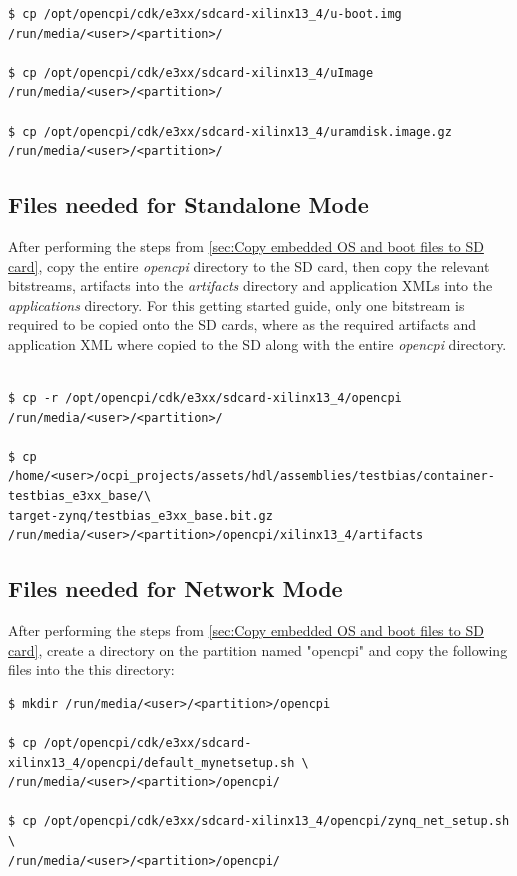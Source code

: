 \begin{appendices}
\begin{verbatim}
$ cp /opt/opencpi/cdk/e3xx/sdcard-xilinx13_4/u-boot.img /run/media/<user>/<partition>/

$ cp /opt/opencpi/cdk/e3xx/sdcard-xilinx13_4/uImage /run/media/<user>/<partition>/

$ cp /opt/opencpi/cdk/e3xx/sdcard-xilinx13_4/uramdisk.image.gz /run/media/<user>/<partition>/
\end{verbatim}\medskip

\subsection{Files needed for Standalone Mode}
After performing the steps from \ref{sec:Copy embedded OS and boot files to SD card}, copy the entire \textit{opencpi} directory to the SD card, then copy the relevant bitstreams, artifacts into the \textit{artifacts} directory and application XMLs into the \textit{applications} directory. For this getting started guide, only one bitstream is required to be copied onto the SD cards, where as the required artifacts and application XML where copied to the SD along with the entire \textit{opencpi} directory.

\begin{verbatim}

$ cp -r /opt/opencpi/cdk/e3xx/sdcard-xilinx13_4/opencpi /run/media/<user>/<partition>/

$ cp /home/<user>/ocpi_projects/assets/hdl/assemblies/testbias/container-testbias_e3xx_base/\
target-zynq/testbias_e3xx_base.bit.gz /run/media/<user>/<partition>/opencpi/xilinx13_4/artifacts
\end{verbatim}

\subsection{Files needed for Network Mode}
After performing the steps from \ref{sec:Copy embedded OS and boot files to SD card}, create a directory on the partition named "opencpi" and copy the following files into the this directory:

\begin{verbatim}
$ mkdir /run/media/<user>/<partition>/opencpi

$ cp /opt/opencpi/cdk/e3xx/sdcard-xilinx13_4/opencpi/default_mynetsetup.sh \
/run/media/<user>/<partition>/opencpi/

$ cp /opt/opencpi/cdk/e3xx/sdcard-xilinx13_4/opencpi/zynq_net_setup.sh \
/run/media/<user>/<partition>/opencpi/
\end{verbatim}

\end{appendices}




